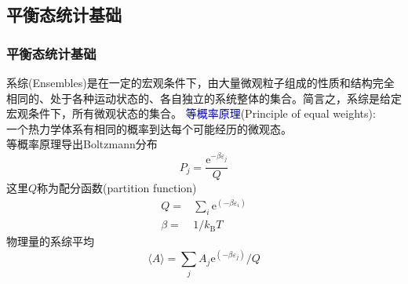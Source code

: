\subsection{平衡态统计基础}
%
\frame
{
	\frametitle{平衡态统计基础}
	系综(\textrm{Ensembles})是在一定的宏观条件下，由大量微观粒子组成的性质和结构完全相同的、处于各种运动状态的、各自独立的系统整体的集合。简言之，系综是给定宏观条件下，所有微观状态的集合。
	\vskip 3pt
	\textcolor{blue}{等概率原理}\textrm{(Principle of equal weights)}:\\
	一个热力学体系有相同的概率到达每个可能经历的微观态。\\
	等概率原理导出\textrm{Boltzmann}分布
	\begin{displaymath}
		P_j=\dfrac{\mathrm{e}^{-\beta\varepsilon_j}}Q
	\end{displaymath}
	这里$Q$称为配分函数\textrm{(partition function)}
	\begin{displaymath}
		\begin{aligned}
			Q=&\sum_i\mathrm{e}^{(-\beta\varepsilon_i)}\\
			\beta=&1/k_{\mathrm{B}}T
		\end{aligned}
	\end{displaymath}
	物理量的系综平均
	\begin{displaymath}
		\langle A\rangle=\sum_jA_j\mathrm{e}^{(-\beta\varepsilon_j)}/Q
	\end{displaymath}
}

